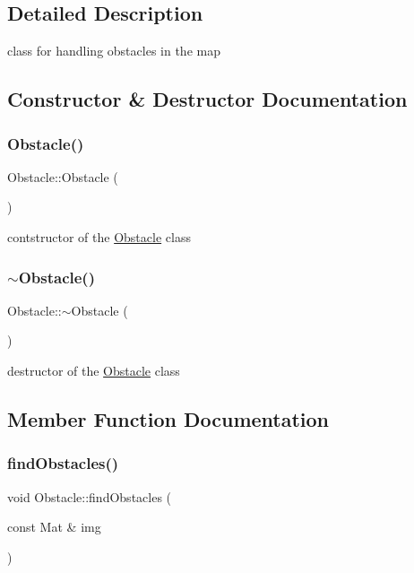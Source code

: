 \subsection{Detailed Description}
class for handling obstacles in the map 

\subsection{Constructor \& Destructor Documentation}
\mbox{\label{class_obstacle_a8f734072321fa06a7b7dae2d5f50f352}} 
\subsubsection{\texorpdfstring{Obstacle()}{Obstacle()}}
{\footnotesize\ttfamily Obstacle\+::\+Obstacle (\begin{DoxyParamCaption}{ }\end{DoxyParamCaption})}

contstructor of the \mbox{\hyperlink{class_obstacle}{Obstacle}} class \mbox{\label{class_obstacle_af2f9cc9c6cff75dca0974fd5ac4f71a9}} 
\subsubsection{\texorpdfstring{$\sim$\+Obstacle()}{~Obstacle()}}
{\footnotesize\ttfamily Obstacle\+::$\sim$\+Obstacle (\begin{DoxyParamCaption}{ }\end{DoxyParamCaption})}

destructor of the \mbox{\hyperlink{class_obstacle}{Obstacle}} class 

\subsection{Member Function Documentation}
\mbox{\label{class_obstacle_ae333b23b742b38e50be13bc7aec2da5b}} 
\subsubsection{\texorpdfstring{find\+Obstacles()}{findObstacles()}}
{\footnotesize\ttfamily void Obstacle\+::find\+Obstacles (\begin{DoxyParamCaption}\item[{const Mat \&}]{img }\end{DoxyParamCaption})}

